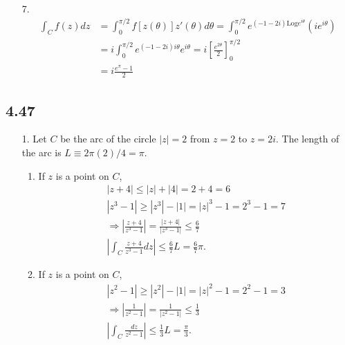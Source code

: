 \documentclass[a4paper,12pt]{article}
\begin{document}
\begin{enumerate}
    \item[7.]
        \begin{align*}
            \int_C f(z) dz &= \int_0^{\pi/2} f[z(\theta)] z'(\theta) d\theta
            = \int_0^{\pi/2} e^{(-1 - 2i) \text{Log} e^{i\theta}} \left( ie^{i \theta} \right) \\
            &= i \int_0^{\pi/2} e^{(-1 - 2i) i\theta} e^{i\theta} = i \left[ \frac{e^{2\theta}}{2} \right]_0^{\pi/2} \\
            &= i \frac{e^\pi - 1}{2}
        \end{align*}
\end{enumerate}

\subsection*{4.47}
\begin{enumerate}
    \item[1.]
        Let $C$ be the arc of the circle $|z| = 2$ from $z = 2$ to $z = 2i$. The length of the arc is $L \equiv 2\pi(2)/4 = \pi$.
        \begin{enumerate}
            \item
                If $z$ is a point on $C$,
                \begin{gather*}
                    |z + 4| \leq |z| + |4| = 2 + 4 = 6 \\
                    |z^3 - 1| \geq |z^3| - |1| = |z|^3 - 1 = 2^3 - 1 = 7 \\
                    \Rightarrow \left| \frac{z + 4}{z^3 - 1} \right| = \frac{|z + 4|}{|z^3 - 1|} \leq \frac{6}{7} \\
                    \left| \int_C \frac{z + 4}{z^3 - 1} dz \right| \leq \frac{6}{7} L = \frac{6}{7} \pi.
                \end{gather*}

            \item
                If $z$ is a point on $C$,
                \begin{gather*}
                    |z^2 - 1| \geq |z^2| - |1| = |z|^2 - 1 = 2^2 - 1 = 3 \\
                    \Rightarrow \left| \frac{1}{z^2 - 1} \right| = \frac{1}{|z^2 - 1|} \leq \frac{1}{3} \\
                    \left| \int_C \frac{dz}{z^2 - 1} \right| \leq \frac{1}{3} L = \frac{\pi}{3}.
                \end{gather*}
        \end{enumerate}
\end{enumerate}
\end{document}
